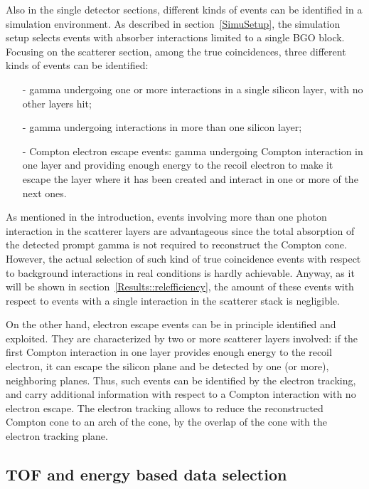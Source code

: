 Also in the single detector sections, different kinds of events can be identified in a simulation environment.
As described in section~\ref{SimuSetup}, the simulation setup selects events with absorber interactions limited to a single BGO block.
Focusing on the scatterer section, among the true coincidences, three different kinds of events can be identified:
\begin{itemize}
\item[-] gamma undergoing one or more interactions in a single silicon layer, with no other layers hit;
\item[-] gamma undergoing interactions in more than one silicon layer;
\item[-] Compton electron escape events: gamma undergoing Compton interaction in one layer and providing enough energy to the recoil electron to make it escape the layer where it has been created and interact in one or more of the next ones.
\end{itemize}

As mentioned in the introduction, events involving more than one photon interaction in the scatterer layers are advantageous since the total absorption of the detected prompt gamma is not required to reconstruct the Compton cone. However, the actual selection of such kind of true coincidence events with respect to background interactions in real conditions is hardly achievable. Anyway, as it will be shown in section~\ref{Results::relefficiency}, the amount of these events with respect to events with a single interaction in the scatterer stack is negligible.

On the other hand, electron escape events can be in principle identified and exploited. They are characterized by two or more scatterer layers involved: if the first Compton interaction in one layer provides enough energy to the recoil electron, it can escape the silicon plane and be detected by one (or more), neighboring planes. Thus, such events can be identified by the electron tracking, and carry additional information with respect to a Compton interaction with no electron escape. The electron tracking allows to reduce the reconstructed Compton cone to an arch of the cone, by the overlap of the cone with the electron tracking plane.      

\subsection{TOF and energy based data selection}
\label{MatMeth::TOF_Ecut}

